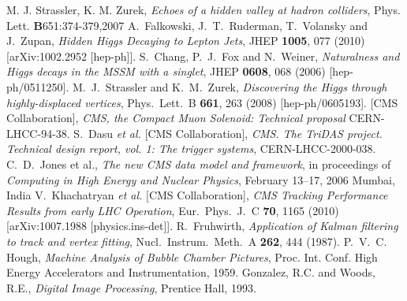 \documentclass{JINST}
\begin{document}
\begin{thebibliography}{9}
M. J. Strassler, K. M. Zurek, 
\emph{Echoes of a hidden valley at hadron colliders},
Phys. Lett. \textbf{B}651:374-379,2007 
%
%
  A.~Falkowski, J.~T.~Ruderman, T.~Volansky and J.~Zupan,
  \emph{Hidden Higgs Decaying to Lepton Jets},
  JHEP {\bf 1005}, 077 (2010)
  [arXiv:1002.2952 [hep-ph]].
%
%
  S.~Chang, P.~J.~Fox and N.~Weiner,
  \emph{Naturalness and Higgs decays in the MSSM with a singlet},
  JHEP {\bf 0608}, 068 (2006)
  [hep-ph/0511250].
%
%
  M.~J.~Strassler and K.~M.~Zurek,
\emph{Discovering the Higgs through highly-displaced vertices},
  Phys.\ Lett.\ B {\bf 661}, 263 (2008)
  [hep-ph/0605193].
%
%
  [CMS Collaboration],
\emph{CMS, the Compact Muon Solenoid: Technical proposal}
  CERN-LHCC-94-38.
%
%
  S.~Dasu {\it et al.}  [CMS Collaboration],
\emph{CMS. The TriDAS project. Technical design report, vol. 1: The trigger systems},
  CERN-LHCC-2000-038.
%
%
C.~D.~Jones et al.,
\emph{The new CMS data model and framework}, in proceedings of
 \emph{Computing in High Energy and Nuclear Physics}, 
February 13--17, 2006 Mumbai, India
%
%
  V.~Khachatryan {\it et al.}  [CMS Collaboration],
  \emph{CMS Tracking Performance Results from early LHC Operation},
  Eur.\ Phys.\ J.\ C {\bf 70}, 1165 (2010)
  [arXiv:1007.1988 [physics.ins-det]].
%
%
  R.~Fruhwirth,
  \emph{Application of Kalman filtering to track and vertex fitting},
  Nucl.\ Instrum.\ Meth.\ A {\bf 262}, 444 (1987).
%
P.~V.~C. Hough, 
\emph{Machine Analysis of Bubble Chamber Pictures}, 
Proc. Int. Conf. High Energy Accelerators and Instrumentation, 1959.
%
%
 Gonzalez, R.C. and Woods, R.E., 
\emph{Digital Image Processing},
Prentice Hall, 1993.

\end{thebibliography}
\end{document}
